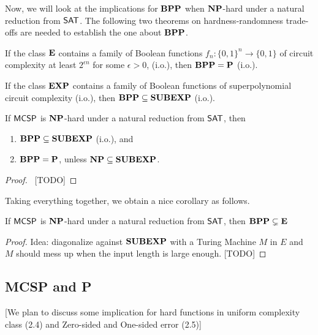 \documentclass[11pt]{article}
\begin{document}
Now, we will look at the implications for $\mathbf{BPP}$ when $\mathbf{NP}$-hard under a natural reduction from $\mathsf{SAT}$. The following two theorems on hardness-randomness trade-offs are needed to establish the one about $\mathbf{BPP}$.

\begin{theorem}
	If the class $\mathbf{E}$ contains a family of Boolean functions $f_n: \{0, 1\}^n \rightarrow \{0, 1\}$ of circuit complexity at least $2^{\epsilon n}$ for some $\epsilon > 0$, (i.o.), then $\mathbf{BPP} = \mathbf{P}$ (i.o.).
\end{theorem}

\begin{theorem}
	If the class $\mathbf{EXP}$ contains a family of Boolean functions of superpolynomial circuit complexity (i.o.), then $\mathbf{BPP} \subseteq \mathbf{SUBEXP}$ (i.o.).
\end{theorem}

\begin{theorem}
	If $\mathsf{MCSP}$ is $\mathbf{NP}$-hard under a natural reduction from $\mathsf{SAT}$, then
	\begin{enumerate} [1.]
		\item $\mathbf{BPP} \subseteq \mathbf{SUBEXP}$ (i.o.), and
		\item $\mathbf{BPP} = \mathbf{P}$, unless $\mathbf{NP} \subseteq \mathbf{SUBEXP}$.
	\end{enumerate}
\end{theorem}

\begin{proof}\
  [TODO]
\end{proof}

Taking everything together, we obtain a nice corollary as follows.

\begin{corollary}
	If $\mathsf{MCSP}$ is $\mathbf{NP}$-hard under a natural reduction from $\mathsf{SAT}$, then $\mathbf{BPP} \subsetneq \mathbf{E}$
\end{corollary}

\begin{proof}
	Idea: diagonalize against $\mathbf{SUBEXP}$ with a Turing Machine $M$ in $E$ and $M$ should mess up when the input length is large enough.
  [TODO]
\end{proof}

\subsection{MCSP and P}
[We plan to discuss some implication for hard functions in uniform complexity class (2.4) and Zero-sided and One-sided error (2.5)] 
\end{document}

